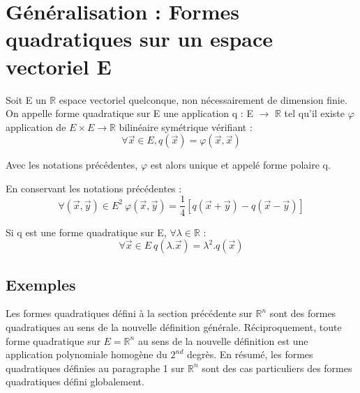 \section{Généralisation : Formes quadratiques sur un espace vectoriel E}
\begin{de}
Soit E un $\mathbb{R}$ espace vectoriel quelconque, non nécessairement de dimension finie. On appelle forme quadratique sur E une application q : E $\rightarrow$ $\mathbb{R}$ tel qu'il existe $\varphi$ application de $E\times E \rightarrow \mathbb{R}$ bilinéaire symétrique vérifiant : 
$$\forall \overrightarrow{x} \in E, q(\overrightarrow{x}) = \varphi(\overrightarrow{x},\overrightarrow{x})$$
\end{de}

\begin{prop}
Avec les notations précédentes, $\varphi$ est alors unique et appelé forme polaire q.
\end{prop}
\begin{prop}
En conservant les notations précédentes : 
$$\forall (\overrightarrow{x},\overrightarrow{y}) \in E^2~ \varphi(\overrightarrow{x},\overrightarrow{y}) = \dfrac{1}{4}[q(\overrightarrow{x} + \overrightarrow{y}) - q(\overrightarrow{x}-\overrightarrow{y})]$$ 
\end{prop}
\begin{prop}
Si q est une forme quadratique sur E, $\forall \lambda \in \mathbb{R}$ :
$$\forall \overrightarrow{x} \in E~ q(\lambda.\overrightarrow{x}) = \lambda^2.q(\overrightarrow{x})$$ 
\end{prop}
\subsection{Exemples}
Les formes quadratiques défini à la section précédente sur $\mathbb{R}^n$ sont des formes quadratiques au sens de la nouvelle définition générale. Réciproquement, toute forme quadratique sur $E = \mathbb{R}^n$ au sens de la nouvelle définition est une application polynomiale homogène du $2^{nd}$ degrès. En résumé, les formes quadratiques définies au paragraphe 1 sur $\mathbb{R}^n$ sont des cas particuliers des formes quadratiques défini globalement.
